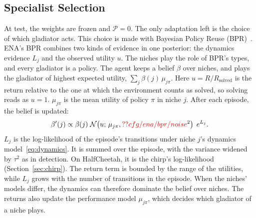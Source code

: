 \subsection{Specialist Selection}
\label{sec:selection}
At test, the weights are frozen and $\mathcal{P}=0$. The only adaptation left is the choice of which gladiator acts. This choice is made with Bayesian Policy Reuse (BPR)~\cite{rosman2016bayesian}. ENA's BPR combines two kinds of evidence in one posterior: the dynamics evidence $L_j$ and the observed utility $u$. The niches play the role of BPR's types, and every gladiator is a policy. The agent keeps a belief $\beta$ over niches, and plays the gladiator of highest expected utility, $\sum_{j}\beta(j)\,\mu_{j\pi}$. Here $u = R/R_{\text{solved}}$ is the return relative to the one at which the environment counts as solved, so solving reads as $u = 1$. $\mu_{j\pi}$ is the mean utility of policy $\pi$ in niche $j$. After each episode, the belief is updated:
\begin{equation}
\beta'(j) \propto \beta(j)\; \mathcal{N}\!\left(u;\, \mu_{j\pi}, \Res{cfg/ena/bpr/noise}^2\right)\; e^{L_j}.
\label{eq:bpr}
\end{equation}
$L_j$ is the log-likelihood of the episode's transitions under niche $j$'s dynamics model~\eqref{eq:dynamics}. It is summed over the episode, with the variance widened by $\tau^2$ as in detection. On HalfCheetah, it is the chirp's log-likelihood (Section~\ref{sec:chirp}). The return term is bounded by the range of the utilities, while $L_j$ grows with the number of transitions in the episode. When the niches' models differ, the dynamics can therefore dominate the belief over niches. The returns also update the performance model $\mu_{j\pi}$, which decides which gladiator of a niche plays.

